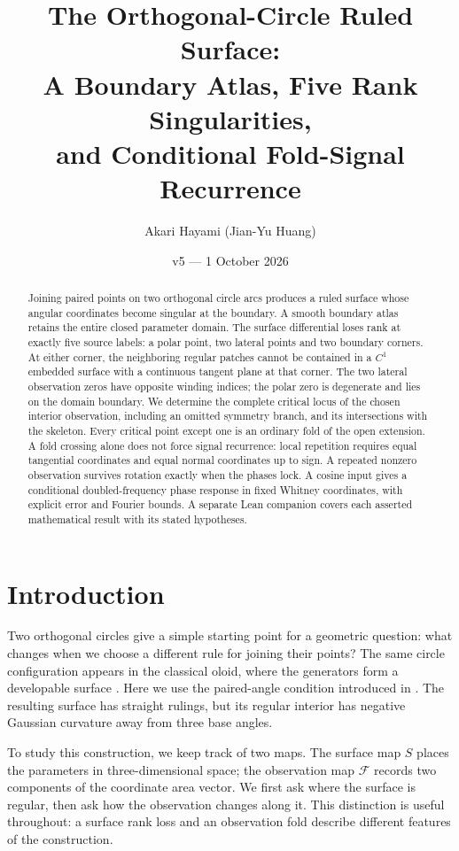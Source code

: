 \documentclass[11pt,a4paper]{article}
\title{The Orthogonal-Circle Ruled Surface:\\A Boundary Atlas, Five Rank Singularities,\\and Conditional Fold-Signal Recurrence}
\author{Akari Hayami (Jian-Yu Huang)}
\date{v5 --- 1 October 2026}
\theoremstyle{definition}\newtheorem{definition}[theorem]{Definition}
\theoremstyle{remark}\newtheorem{remark}[theorem]{Remark}
\newcommand{\Map}{\mathcal F}\newcommand{\Pcore}{\mathcal P}
\begin{document}
\maketitle
\begin{abstract}
Joining paired points on two orthogonal circle arcs produces a ruled surface
whose angular coordinates become singular at the boundary. A smooth boundary
atlas retains the entire closed parameter domain. The surface differential loses rank at exactly five
source labels: a polar point, two lateral points and two boundary corners.
At either corner, the neighboring regular patches cannot be contained in a
$C^1$ embedded surface with a continuous tangent plane at that corner. The two lateral observation zeros have opposite winding
indices; the polar zero is degenerate and lies on the domain boundary.
We determine the complete critical locus of the chosen interior observation,
including an omitted symmetry branch, and its intersections with the skeleton.
Every critical point except one is an ordinary fold of the open extension.
A fold crossing alone does not force signal recurrence: local repetition
requires equal tangential coordinates and equal normal coordinates up to sign.
A repeated nonzero observation survives rotation exactly when the phases lock.
A cosine input gives a conditional doubled-frequency phase response in fixed
Whitney coordinates, with explicit error and Fourier bounds. A separate Lean
companion covers each asserted mathematical result with its stated hypotheses.
\end{abstract}
\section*{Introduction}
Two orthogonal circles give a simple starting point for a geometric
question: what changes when we choose a different rule for joining their
points? The same circle configuration appears in the classical oloid,
where the generators form a developable surface \cite{oloid}.
Here we use the paired-angle condition introduced in \cite{historical}.
The resulting surface has straight rulings, but its regular interior has
negative Gaussian curvature away from three base angles.

To study this construction, we keep track of two maps. The surface map
$S$ places the parameters in three-dimensional space; the observation
map $\Map$ records two components of the coordinate area vector.
We first ask where the surface is regular, then ask how the observation
changes along it. This distinction is useful throughout: a surface rank
loss and an observation fold describe different features of the construction.
\end{document}
